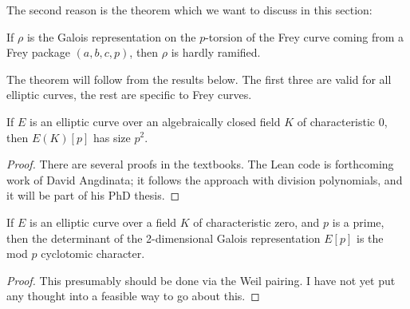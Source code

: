 %
%
%

The second reason is the theorem which we want to discuss in this section:

\begin{theorem}\label{frey_curve_hardly_ramified} If $\rho$ is the Galois representation on the $p$-torsion of the Frey curve coming from a Frey package $(a,b,c,p)$, then $\rho$ is hardly ramified.
\end{theorem}

The theorem will follow from the results below. The first three are valid for all elliptic curves, the rest are specific to Frey curves.

\begin{theorem}\label{p_torsion_2d} If $E$ is an elliptic curve over an algebraically closed field $K$ of characteristic $0$, then $E(K)[p]$ has size $p^2$.
\end{theorem}
\begin{proof}
  There are several proofs in the textbooks. The Lean code is forthcoming work of David Angdinata; it follows the approach with division polynomials, and it will be part of his PhD thesis.
\end{proof}

\begin{theorem}\label{Elliptic_curve_det_p_torsion} If $E$ is an elliptic curve over a field $K$ of characteristic zero, and $p$ is a prime, then the determinant of the 2-dimensional Galois representation $E[p]$ is the mod $p$ cyclotomic character.
\end{theorem}
\begin{proof}
  This presumably should be done via the Weil pairing. I have not yet put any thought into a feasible way to go about this.
\end{proof}

